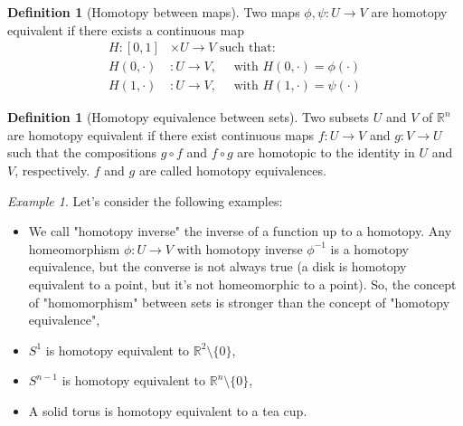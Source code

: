 \documentclass[a4paper,11pt,titlepage, article, oneside]{memoir}
\numberwithin{equation}{section}
\theoremstyle{definition}
\newtheorem{definition}[theorem]{Definition}
\theoremstyle{remark}
\newtheorem{example}[theorem]{Example}
\newcommand{\rfield}{\mathbb{R}}
\begin{document}
\begin{definition}[Homotopy between maps]
  Two maps $\phi, \psi \colon U \rightarrow V$ are homotopy equivalent if there exists a continuous map
  \begin{align*}
    H \colon [0,1] &\times U \rightarrow V \text{ such that:}\\
    H(0, \cdot) &\colon U \rightarrow V, \quad \text{ with } H(0, \cdot) = \phi(\cdot) \\
    H(1, \cdot) & \colon U \rightarrow V, \quad \text{ with } H(1, \cdot) = \psi(\cdot)
  \end{align*}
\end{definition}

 \begin{definition}[Homotopy equivalence between sets]
   Two subsets $U$ and $V$ of $\rfield^n$ are homotopy equivalent if there exist continuous maps $f \colon U \rightarrow V$ and $g \colon V \rightarrow U$ such that the compositions $g \circ f$ and $f \circ g$ are homotopic to the identity in $U$ and $V$, respectively. $f$ and $g$ are called homotopy equivalences.
 \end{definition}

 \begin{tcolorbox}\begin{example}
   Let's consider the following examples:
   \begin{itemize}
     \item We call "homotopy inverse" the inverse of a function up to a homotopy. Any homeomorphism $\phi \colon U \rightarrow V$ with homotopy inverse $\phi^{-1}$ is a homotopy equivalence, but the converse is not always true (a disk is homotopy equivalent to a point, but it's not homeomorphic to a point). So, the concept of "homomorphism" between sets is stronger than the concept of "homotopy equivalence",
     \item $S^1$ is homotopy equivalent to $\rfield^2 \setminus \{0\}$,
     \item $S^{n-1}$ is homotopy equivalent to $\rfield^n \setminus \{0\}$,
     \item A solid torus is homotopy equivalent to a tea cup.
   \end{itemize}
 \end{example}\end{tcolorbox}
\end{document}
